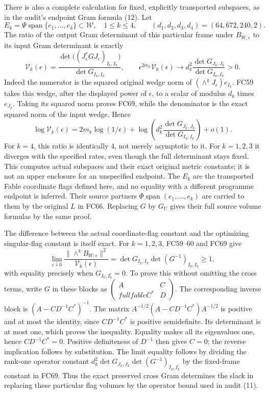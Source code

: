 There is also a complete calculation for fixed, explicitly transported
subspaces, as in the audit's endpoint Gram formula (12). Let
\[
 E_k=\Psi\operatorname{span}\{e_1,\ldots,e_k\}\subset\mathcal W,
 \quad 1\le k\le4,
 \qquad (d_1,d_2,d_3,d_4)=(64,672,240,2).
\]
The ratio of the output Gram determinant of this particular frame under
$B_{W,\epsilon}$ to its input Gram determinant is exactly
\[
 \mathcal V_k(\epsilon)=
 \frac{\det\bigl((J_\epsilon^*GJ_\epsilon)_{I_k,I_k}\bigr)}
      {\det G_{I_k,I_k}},\qquad
 \epsilon^{2m_k}\mathcal V_k(\epsilon)
 \longrightarrow d_k^2\frac{\det G_{J_k,J_k}}{\det G_{I_k,I_k}}>0.
 \tag{FC69}
\]
Indeed the numerator is the squared original wedge norm of
$(\wedge^kJ_\epsilon)e_{I_k}$. FC59 takes this wedge, after
the displayed power of $\epsilon$, to a scalar of modulus $d_k$
times $e_{J_k}$. Taking its squared norm proves FC69, while the
denominator is the exact squared norm of the input wedge. Hence
\[
 \log\mathcal V_k(\epsilon)=2m_k\log(1/\epsilon)
   +\log\left(d_k^2\frac{\det G_{J_k,J_k}}
                                {\det G_{I_k,I_k}}\right)+o(1).
 \tag{FC70}
\]
For $k=4$, this ratio is identically $4$, not merely asymptotic to it.
For $k=1,2,3$ it diverges with the specified rates, even though the
full determinant stays fixed. This computes actual subspaces and their
exact original metric constants; it is not an upper enclosure for an
unspecified endpoint. The $E_k$ are the transported Fable coordinate
flags defined here, and no equality with a different programme endpoint
is inferred. Their source partners $\Phi\operatorname{span}(e_1,\ldots,e_k)$
are carried to them by the original $L$ in FC66. Replacing $G$ by
$G_U$ gives their full source volume formulas by the same proof.

The difference between the actual coordinate-flag constant and the
optimizing singular-flag constant is itself exact. For $k=1,2,3$,
FC59--60 and FC69 give
\[
 \lim_{\epsilon\downarrow0}
 \frac{\|\wedge^k B_{W,\epsilon}\|^2}{\mathcal V_k(\epsilon)}
 =\det G_{I_k,I_k}\det(G^{-1})_{I_k,I_k}\ge1,
 \tag{FC71}
\]
with equality precisely when $G_{I_k,I_k^c}=0$. To prove this
without omitting the cross terms, write $G$ in these blocks as
$\left(\begin{smallmatrix}A&C\\fullfableC^*&D\end{smallmatrix}\right)$.
The corresponding inverse block is $(A-CD^{-1}C^*)^{-1}$.
The matrix $A^{-1/2}(A-CD^{-1}C^*)A^{-1/2}$ is positive and at
most the identity, since $CD^{-1}C^*$ is positive semidefinite.
Its determinant is at most one, which proves the inequality.
Equality makes all its eigenvalues one, hence $CD^{-1}C^*=0$.
Positive definiteness of $D^{-1}$ then gives $C=0$; the reverse
implication follows by substitution. The limit equality follows
by dividing the rank-one operator constant
$d_k^2\det G_{J_k,J_k}\det(G^{-1})_{I_k,I_k}$ by the fixed-frame
constant in FC69. Thus the exact preserved cross Gram determines
the slack in replacing these particular flag volumes by the operator
bound used in audit (11).

